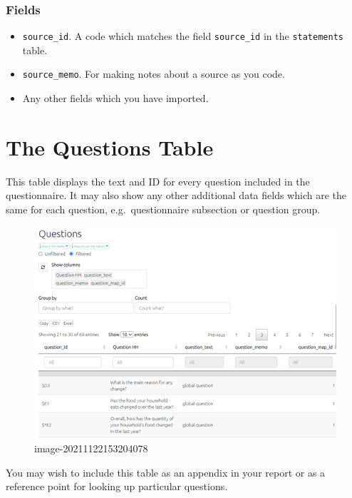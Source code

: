 \documentclass[
]{book}
\providecommand{\tightlist}{%
  \setlength{\itemsep}{0pt}\setlength{\parskip}{0pt}}
\begin{document}
\hypertarget{fields-2}{%
\subsection{Fields}\label{fields-2}}

\begin{itemize}
\tightlist
\item
  \texttt{source\_id}. A code which matches the field \texttt{source\_id} in the \texttt{statements} table.
\item
  \texttt{source\_memo}. For making notes about a source as you code.
\item
  Any other fields which you have imported.
\end{itemize}

\hypertarget{xthe-questions-table}{%
\chapter{The Questions Table}\label{xthe-questions-table}}

This table displays the text and ID for every question included in the questionnaire. It may also show any other additional data fields which are the same for each question, e.g.~questionnaire subsection or question group.

\begin{figure}
\centering
\includegraphics[width=6.77083in,height=\textheight]{_assets/image-20211122153204078.png}
\caption{image-20211122153204078}
\end{figure}

You may wish to include this table as an appendix in your report or as a reference point for looking up particular questions.
\end{document}
